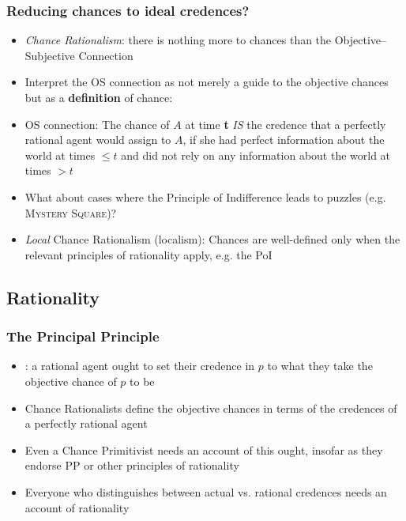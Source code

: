 \begin{frame}
\frametitle{Reducing chances to ideal credences?}

\begin{itemize}[<+->]

\item \emph{Chance Rationalism}: there is nothing more to chances than the Objective--Subjective Connection

\item Interpret the OS connection as not merely a guide to the objective chances but as a \textbf{definition} of chance: 

\item[] OS connection: The chance of $A$ at time \textbf{t} \emph{IS} the credence that a perfectly rational agent would assign to $A$, if she had perfect information about the world at times $\leq t$ and did not rely on any information about the world at times $> t$

\item What about cases where the Principle of Indifference leads to puzzles (e.g. \textsc{Mystery Square})? 

\item \emph{Local} Chance Rationalism (localism): Chances are well-defined only when the relevant principles of rationality apply, e.g. the PoI 

\end{itemize}
\end{frame}



\iffalse %

\subsection{Rationality}

\begin{frame}
\frametitle{The Principal Principle}

\begin{itemize}[<+->]

\item {}: a rational agent \textcolor{OGlyallpink}{ought} to set their credence in $p$ to what they take the objective chance of $p$ to be

\item Chance Rationalists define the objective chances in terms of the credences of a \textcolor{OGlyallpink}{perfectly rational agent}

\item Even a Chance Primitivist needs an account of this \textcolor{OGlyallpink}{ought}, insofar as they endorse PP or other principles of rationality

\item Everyone who distinguishes between actual vs. rational credences needs an account of rationality


\end{itemize}
\end{frame}

